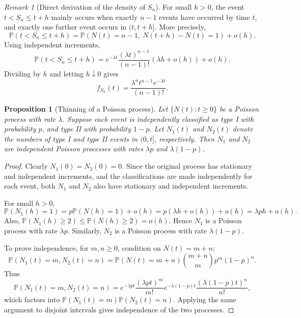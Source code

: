 \documentclass[11pt]{article}
\theoremstyle{plain}
\newtheorem{proposition}[theorem]{Proposition}
\theoremstyle{definition}
\theoremstyle{remark}
\newtheorem{remark}[theorem]{Remark}
\begin{document}
	\begin{remark}[Direct derivation of the density of \(S_n\)]
		For small \(h>0\), the event \(t<S_n\le t+h\) mainly occurs when exactly \(n-1\) events have occurred by time \(t\), and exactly one further event occurs in \((t,t+h]\). More precisely,
		\[
		\mathbb{P}(t<S_n\le t+h)
		=
		\mathbb{P}(N(t)=n-1,\ N(t+h)-N(t)=1)+o(h).
		\]
		Using independent increments,
		\[
		\mathbb{P}(t<S_n\le t+h)
		=
		e^{-\lambda t}\frac{(\lambda t)^{n-1}}{(n-1)!}(\lambda h+o(h))+o(h).
		\]
		Dividing by \(h\) and letting \(h\downarrow 0\) gives
		\[
		f_{S_n}(t)=\frac{\lambda^n t^{n-1}e^{-\lambda t}}{(n-1)!}.
		\]
	\end{remark}
	
	\begin{proposition}[Thinning of a Poisson process]
		Let \(\{N(t):t\ge 0\}\) be a Poisson process with rate \(\lambda\). Suppose each event is independently classified as type I with probability \(p\), and type II with probability \(1-p\). Let \(N_1(t)\) and \(N_2(t)\) denote the numbers of type I and type II events in \((0,t]\), respectively. Then \(N_1\) and \(N_2\) are independent Poisson processes with rates \(\lambda p\) and \(\lambda(1-p)\).
	\end{proposition}
	
	\begin{proof}
		Clearly \(N_1(0)=N_2(0)=0\). Since the original process has stationary and independent increments, and the classifications are made independently for each event, both \(N_1\) and \(N_2\) also have stationary and independent increments.
		
		For small \(h>0\),
		\[
		\mathbb{P}(N_1(h)=1)
		=
		p\mathbb{P}(N(h)=1)+o(h)
		=
		p(\lambda h+o(h))+o(h)
		=
		\lambda p h+o(h).
		\]
		Also, \(\mathbb{P}(N_1(h)\ge 2)\le \mathbb{P}(N(h)\ge 2)=o(h)\). Hence \(N_1\) is a Poisson process with rate \(\lambda p\). Similarly, \(N_2\) is a Poisson process with rate \(\lambda(1-p)\).
		
		To prove independence, for \(m,n\ge 0\), condition on \(N(t)=m+n\):
		\[
		\mathbb{P}(N_1(t)=m,N_2(t)=n)
		=
		\mathbb{P}(N(t)=m+n)\binom{m+n}{m}p^m(1-p)^n.
		\]
		Thus
		\[
		\mathbb{P}(N_1(t)=m,N_2(t)=n)
		=
		e^{-\lambda pt}\frac{(\lambda pt)^m}{m!}
		e^{-\lambda(1-p)t}\frac{(\lambda(1-p)t)^n}{n!},
		\]
		which factors into \(\mathbb{P}(N_1(t)=m)\mathbb{P}(N_2(t)=n)\). Applying the same argument to disjoint intervals gives independence of the two processes.
	\end{proof}
	
\end{document}
